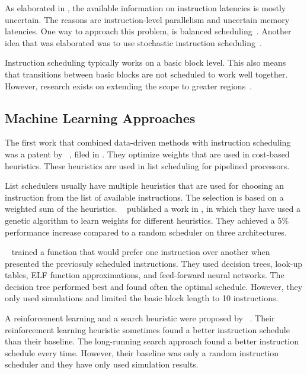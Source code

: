 As elaborated in , the available information on instruction latencies is mostly uncertain.
The reasons are instruction-level parallelism and uncertain memory latencies.
One way to approach this problem, is balanced scheduling~\cite{kerns1993balanced,lo1995improving}.
Another idea that was elaborated was to use stochastic instruction scheduling~\cite{schielke2000stochastic}.

Instruction scheduling typically works on a basic block level.
This also means that transitions between basic blocks are not scheduled to work well together.
However, research exists on extending the scope to greater regions~\cite{fisher1981trace,bernstein1991global,hwu1993superblock}.

\subsection{Machine Learning Approaches}
The first work that combined data-driven methods with instruction scheduling was a patent by \citeauthor{tarsy1994method}~\cite{tarsy1994method}, filed in \citeyear{tarsy1994method}.
They optimize weights that are used in cost-based heuristics.
These heuristics are used in list scheduling for pipelined processors.

List schedulers usually have multiple heuristics that are used for choosing an instruction from the list of available instructions.
The selection is based on a weighted sum of the heuristics.
\citeauthor{beaty1996using}~\cite{beaty1996using} published a work in \citeyear{beaty1996using}, in which they have used a genetic algorithm to learn weights for different heuristics.
They achieved a 5\% performance increase compared to a random scheduler on three architectures.

\citeauthor{moss1997learning}~\cite{moss1997learning} trained a function that would prefer one instruction over another when presented the previosuly scheduled instructions.
They used decision trees, look-up tables, ELF function approximations, and feed-forward neural networks.
The decision tree performed best and found often the optimal schedule.
However, they only used simulations and limited the basic block length to 10 instructions.

A reinforcement learning and a search heuristic were proposed by \citeauthor{mcgovern1999scheduling}~\cite{mcgovern1999scheduling,mcgovern2002building}.
Their reinforcement learning heuristic sometimes found a better instruction schedule than their baseline.
The long-running search approach found a better instruction schedule every time.
However, their baseline was only a random instruction scheduler and they have only used simulation results.

